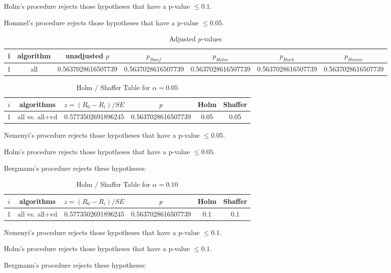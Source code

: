 \documentclass[a4paper,10pt]{article}
\begin{document}
\begin{landscape}
Holm's procedure rejects those hypotheses that have a p-value $\le0.1$.


Hommel's procedure rejects those hypotheses that have a p-value $\le0.05$.


\begin{table}[!htp]
\centering\tiny
\caption{Adjusted $p$-values}
\begin{tabular}{ccccccc}
i&algorithm&unadjusted $p$&$p_{Bonf}$&$p_{Holm}$&$p_{Hoch}$&$p_{Homm}$\\
\hline
1&all&0.5637028616507739&0.5637028616507739&0.5637028616507739&0.5637028616507739&0.5637028616507739\\
\hline
\end{tabular}
\end{table}

\begin{table}[!htp]
\centering\tiny
\caption{Holm / Shaffer Table for $\alpha=0.05$}
\begin{tabular}{cccccc}
$i$&algorithms&$z=(R_0 - R_i)/SE$&$p$&Holm&Shaffer\\
\hline
1&all vs. all+vd&0.5773502691896245&0.5637028616507739&0.05&0.05\\\hline
\end{tabular}
\end{table}
Nemenyi's procedure rejects those hypotheses that have a p-value $\le0.05$.


Holm's procedure rejects those hypotheses that have a p-value $\le0.05$.


Bergmann's procedure rejects these hypotheses:


\begin{itemize}


\end{itemize}


\begin{table}[!htp]
\centering\tiny
\caption{Holm / Shaffer Table for $\alpha=0.10$}
\begin{tabular}{cccccc}
$i$&algorithms&$z=(R_0 - R_i)/SE$&$p$&Holm&Shaffer\\
\hline
1&all vs. all+vd&0.5773502691896245&0.5637028616507739&0.1&0.1\\\hline
\end{tabular}
\end{table}
Nemenyi's procedure rejects those hypotheses that have a p-value $\le0.1$.


Holm's procedure rejects those hypotheses that have a p-value $\le0.1$.


Bergmann's procedure rejects these hypotheses:



\end{landscape}
\end{document}
